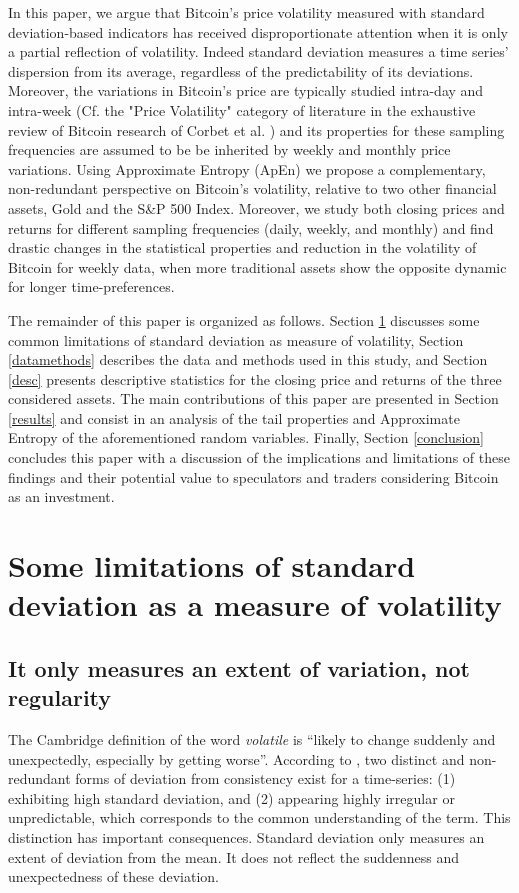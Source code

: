 \documentclass[12pt]{article}
\begin{document}
 In this paper, we argue that Bitcoin's price volatility measured with standard deviation-based indicators  has received disproportionate attention when it is only a partial reflection of volatility. Indeed standard deviation measures a time series' dispersion from its average, regardless of the predictability of its deviations. Moreover, the variations in Bitcoin's price are typically studied intra-day and intra-week (Cf. the "Price Volatility" category of literature in the exhaustive review of Bitcoin research of Corbet et al. \cite{corbet}) and its properties for these sampling frequencies are assumed to be be inherited by weekly and monthly price variations. Using Approximate Entropy (ApEn) \cite{pincus91} we propose a complementary, non-redundant perspective on Bitcoin's volatility, relative to two other financial assets, Gold and the S\&P 500 Index. Moreover, we study both closing prices and returns for different sampling frequencies (daily, weekly, and monthly) and find drastic changes in the statistical properties and reduction in the volatility of Bitcoin for weekly data, when more traditional assets show the opposite dynamic for longer time-preferences.  
 
  The remainder of this paper is organized as follows.  Section \ref{toy} discusses some common limitations of standard deviation as measure of volatility, Section \ref{datamethods} describes the data and methods used in this study, and Section \ref{desc} presents descriptive statistics for the closing price and returns of the three considered assets. The main contributions of this paper are presented in Section \ref{results} and consist in an analysis of the tail properties and Approximate Entropy of the aforementioned random variables. Finally, Section \ref{conclusion} concludes this paper with a discussion of the implications and limitations of these findings and their potential value to speculators and traders considering Bitcoin as an investment.









\section{Some limitations of standard deviation as a measure of volatility}
\label{toy}
\subsection{It only measures an extent of variation, not regularity}
  The Cambridge definition of the word \textit{volatile} is “likely to change suddenly and unexpectedly, especially by getting worse”. According to \cite{pincus04}, two distinct and non-redundant forms of deviation from consistency exist for a time-series: (1) exhibiting high standard deviation, and (2) appearing highly irregular or unpredictable, which corresponds to the common understanding of the term. This distinction has important consequences. Standard deviation only measures an extent of deviation from the mean. It does not reflect the suddenness and unexpectedness of these deviation. 
\end{document}
